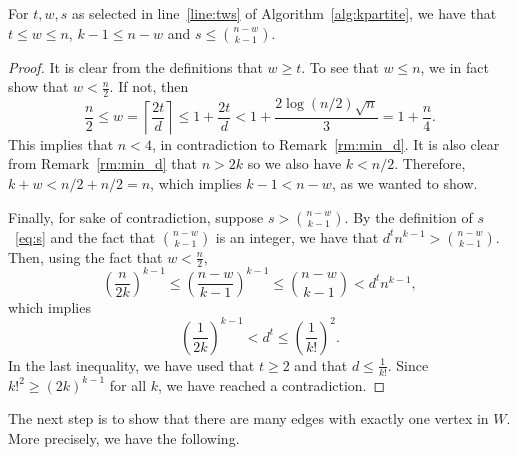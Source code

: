 \begin{lemma}\label{lm:sound}
    For $t, w, s$ as selected in line~\ref{line:tws} of Algorithm~\ref{alg:kpartite},
    we have that
    $t  \leq w \leq n$, $k - 1 \leq n - w$ and $s \leq \binom{n - w}{k - 1}$.
    \begin{proof}
        It is clear from the definitions that $w \geq t$.
        To see that $w \leq n$, we in fact show that $w < \frac{n}{2}$.
        If not, then
        \[
            \frac{n}{2} \leq
            w =
            \left\lceil \frac{2t}{d} \right\rceil \leq
            1 + \frac{2t}{d} <
            1 + \frac{2 \log (n/2) \sqrt{n}}{3} = %
            1 + \frac{n}{4}.
        \]
        This implies that $n < 4$, in contradiction to Remark~\ref{rm:min_d}.
        It is also clear from Remark~\ref{rm:min_d} that $n > 2k$
        so we also have $k < n/2$.
        Therefore, $ k + w < n/2 + n/2 = n$, which implies $k - 1 < n - w$,
        as we wanted to show.

        Finally, for sake of contradiction,
        suppose $s > \binom{n - w}{k - 1}$.
        By the definition of $s$~\eqref{eq:s}
        and the fact that $\binom{n-w}{k-1}$ is an integer, we have that
        $d^t n^{k-1} > \binom{n - w}{k - 1}$.
        Then, using the fact that $w < \frac{n}{2}$,
        \[
            \left( \frac{n}{2k} \right)^{k-1} \leq
            \left( \frac{n-w}{k-1} \right)^{k-1} \leq
            \binom{n - w}{k - 1} < d^t n^{k-1},
        \]
        which implies
        \[
            \left( \frac{1}{2k} \right)^{k-1} < d^t \leq
            \left( \frac{1}{k!} \right)^2.
        \]
        In the last inequality, we have used that $t \geq 2$ and that $d \leq \frac{1}{k!}$.
        Since $k!^2 \geq (2k)^{k-1}$ for all $k$,
        we have reached a contradiction. \qedhere

    \end{proof}
\end{lemma}

The next step is to show that there are many edges with exactly one vertex in $W$.
More precisely, we have the following.


